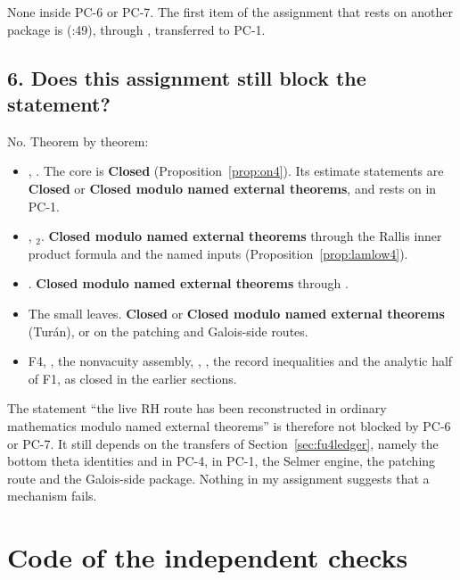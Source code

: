 \documentclass[11pt]{article}
\newcommand{\PC}[1]{\textsf{PC-#1}}
\newcommand{\sC}{\textbf{Closed}}
\newcommand{\sE}{\textbf{Closed modulo named external theorems}}
\theoremstyle{remark}
\begin{document}
None inside \PC{6} or \PC{7}. The first item of the assignment that rests on another package is  (:49), through , transferred to \PC{1}.

\subsection*{6. Does this assignment still block the statement?}

No. Theorem by theorem:
\begin{itemize}[nosep]
\item {}, . The core is \sC{} (Proposition~\ref{prop:on4}). Its estimate statements are \sC{} or \sE, and  rests on  in \PC{1}.
\item {}, $_2$. \sE{} through the Rallis inner product formula and the named inputs (Proposition~\ref{prop:lamlow4}).
\item {}. \sE{} through .
\item The small leaves. \sC{} or \sE{} (Tur\'an), or on the patching and Galois-side routes.
\item F4, , the nonvacuity assembly, , , the record inequalities and the analytic half of F1, as closed in the earlier sections.
\end{itemize}
The statement ``the live RH route has been reconstructed in ordinary mathematics modulo named external theorems'' is therefore not blocked by \PC{6} or \PC{7}. It still depends on the transfers of Section~\ref{sec:fu4ledger}, namely the bottom theta identities and  in \PC{4},  in \PC{1}, the Selmer engine, the patching route and the Galois-side package. Nothing in my assignment suggests that a mechanism fails.

\appendix
\section{Code of the independent checks}\label{app:code}
\end{document}
